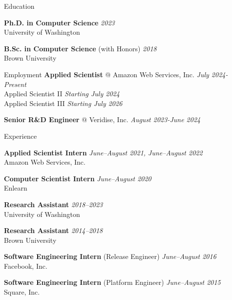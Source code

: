\documentclass{resume} %
\begin{document}
\begin{rSection}{Education}

{\bf Ph.D. in Computer Science} \hfill {\em 2023} \\ 
University of Washington

{\bf B.Sc. in Computer Science} (with Honors) \hfill {\em 2018} \\
Brown University  

\end{rSection}

\begin{rSection}{Employment}
  {\bf Applied Scientist} @ Amazon Web Services, Inc.
  \hfill {\em July 2024-Present} \\ 
  Applied Scientist II \hfill 
  {\em Starting July 2024} \\
  Applied Scientist III \hfill 
  {\em Starting July 2026}
  
  {\bf Senior R\&D Engineer} @ Veridise, Inc. 
  \hfill{\em August 2023-June 2024} \\ 
\end{rSection}

\begin{rSection}{Experience}

  {\bf Applied Scientist Intern} \hfill {\em June--August 2021, June--August 2022} \\ 
  Amazon Web Services, Inc.

  {\bf Computer Scientist Intern} \hfill {\em June--August 2020} \\ 
  Enlearn

  {\bf Research Assistant} \hfill {\em 2018--2023} \\ 
  University of Washington

  {\bf Research Assistant} \hfill {\em 2014--2018} \\ 
  Brown University

  {\bf Software Engineering Intern} (Release Engineer) \hfill {\em June--August 2016} \\ 
  Facebook, Inc. 

  {\bf Software Engineering Intern} (Platform Engineer) \hfill {\em June--August 2015} \\
  Square, Inc.  

\end{rSection}
\end{document}
